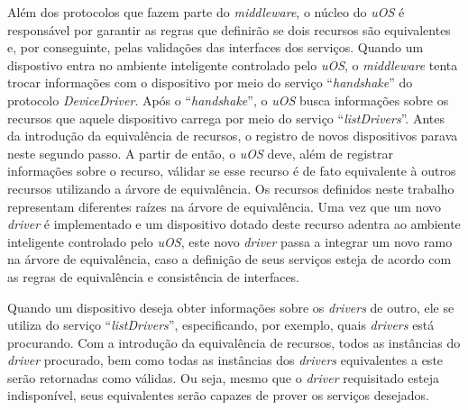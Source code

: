 Além dos protocolos que fazem parte do \emph{middleware}, o núcleo do \emph{uOS} é responsável por garantir as regras que definirão se dois recursos são equivalentes e, por conseguinte, pelas validações das interfaces dos serviços. Quando um dispostivo entra no ambiente inteligente controlado pelo \emph{uOS}, o \emph{middleware} tenta trocar informações com o dispositivo por meio do serviço ``\emph{handshake}'' do protocolo \emph{DeviceDriver}. Após o ``\emph{handshake}'', o \emph{uOS} busca informações sobre os recursos que aquele dispositivo carrega por meio do serviço ``\emph{listDrivers}''. Antes da introdução da equivalência de recursos, o registro de novos dispositivos parava neste segundo passo. A partir de então, o \emph{uOS} deve, além de registrar informações sobre o recurso, válidar se esse recurso é de fato equivalente à outros recursos utilizando a árvore de equivalência. Os recursos definidos neste trabalho representam diferentes raízes na árvore de equivalência. Uma vez que um novo \emph{driver} é implementado e um dispositivo dotado deste recurso adentra ao ambiente inteligente controlado pelo \emph{uOS}, este novo \emph{driver} passa a integrar um novo ramo na árvore de equivalência, caso a definição de seus serviços esteja de acordo com as regras de equivalência e consistência de interfaces.

Quando um dispositivo deseja obter informações sobre os \emph{drivers} de outro, ele se utiliza do serviço ``\emph{listDrivers}'', especificando, por exemplo, quais \emph{drivers} está procurando. Com a introdução da equivalência de recursos, todos as instâncias do \emph{driver} procurado, bem como todas as instâncias dos \emph{drivers} equivalentes a este serão retornadas como válidas. Ou seja, mesmo que o \emph{driver} requisitado esteja indisponível, seus equivalentes serão capazes de prover os serviços desejados.
